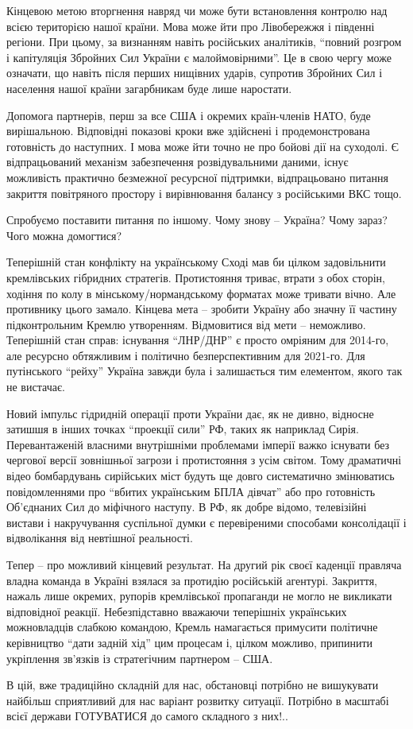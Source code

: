 Кінцевою метою вторгнення навряд чи може бути встановлення контролю над всією
територією нашої країни. Мова може йти про Лівобережжя і південні регіони. При
цьому, за визнанням навіть російських аналітиків, “повний розгром і капітуляція
Збройних Сил України є малоймовірними”. Це в свою чергу може означати, що
навіть після перших нищівних ударів, супротив Збройних Сил і населення нашої
країни загарбникам буде лише наростати.

Допомога партнерів, перш за все США і окремих країн-членів НАТО, буде
вирішальною. Відповідні показові кроки вже здійснені і продемонстрована
готовність до наступних. І мова може йти точно не про бойові дії на суходолі. Є
відпрацьований механізм забезпечення розвідувальними даними, існує можливість
практично безмежної ресурсної підтримки, відпрацьовано питання закриття
повітряного простору і вирівнювання балансу з російськими ВКС тощо.

Спробуємо поставити питання по іншому. Чому знову – Україна? Чому зараз? Чого можна домогтися?

Теперішній стан конфлікту на українському Сході мав би цілком задовільнити
кремлівських гібридних стратегів. Протистояння триває, втрати з обох сторін,
ходіння по колу в мінському/нормандському форматах може тривати вічно. Але
противнику цього замало. Кінцева мета – зробити Україну або значну її частину
підконтрольним Кремлю утворенням. Відмовитися від мети – неможливо. Теперішній
стан справ: існування “ЛНР/ДНР” є просто омріяним для 2014-го, але ресурсно
обтяжливим і політично безперспективним для 2021-го. Для путінського “рейху”
Україна завжди була і залишається тим елементом, якого так не вистачає.

Новий імпульс гідридній операції проти України дає, як не дивно, відносне
затишшя в інших точках “проекції сили” РФ, таких як наприклад Сирія.
Перевантаженій власними внутрішніми проблемами імперії важко існувати без
чергової версії зовнішньої загрози і протистояння з усім світом. Тому
драматичні відео бомбардувань сирійських міст будуть ще довго систематично
змінюватись повідомленнями про “вбитих українським БПЛА дівчат” або про
готовність Об’єднаних Сил до міфічного наступу. В РФ, як добре відомо,
телевізійні вистави і накручування суспільної думки є перевіреними способами
консолідації і відволікання від невтішної реальності.

Тепер – про можливий кінцевий результат. На другий рік своєї каденції правляча
владна команда в Україні взялася за протидію російській агентурі. Закриття,
нажаль лише окремих, рупорів кремлівської пропаганди не могло не викликати
відповідної реакції. Небезпідставно вважаючи теперішніх українських
можновладців слабкою командою, Кремль намагається примусити політичне
керівництво “дати задній хід” цим процесам і, цілком можливо, припинити
укріплення зв’язків із стратегічним партнером – США.

В цій, вже традиційно складній для нас, обстановці потрібно не вишукувати
найбільш сприятливий для нас варіант розвитку ситуації. Потрібно в масштабі
всієї держави ГОТУВАТИСЯ до самого складного з них!..
